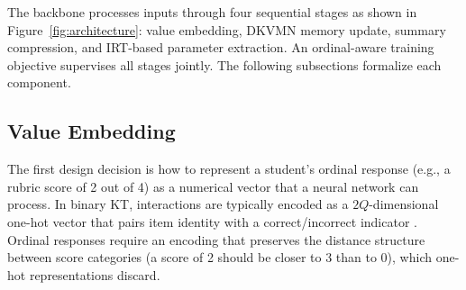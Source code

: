 \documentclass[pdflatex,sn-apa]{sn-jnl}
\begin{document}
The backbone processes inputs through four sequential stages as shown in Figure~\ref{fig:architecture}: value embedding, DKVMN memory update, summary compression, and IRT-based parameter extraction. An ordinal-aware training objective supervises all stages jointly. The following subsections formalize each component.


\subsection{Value Embedding}
The first design decision is how to represent a student's ordinal response (e.g., a rubric score of 2 out of 4) as a numerical vector that a neural network can process. In binary KT, interactions are typically encoded as a $2Q$-dimensional one-hot vector that pairs item identity with a correct/incorrect indicator \citep{piech_deep_2015, zhang_dynamic_2017}. Ordinal responses require an encoding that preserves the distance structure between score categories (a score of 2 should be closer to 3 than to 0), which one-hot representations discard.
\end{document}
